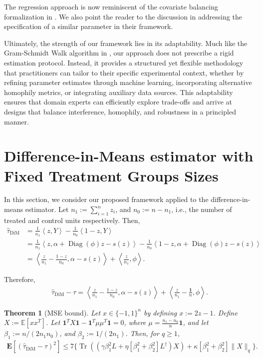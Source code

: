 \documentclass[12pt]{article}
\newtheorem{theorem}{Theorem}
\theoremstyle{definition}
\numberwithin{equation}{section}
\numberwithin{figure}{section}
\newcommand\dotp[1]{\left\langle #1 \right\rangle}
\newcommand{\Diag}{\operatorname{Diag}}
\numberwithin{equation}{section}
\numberwithin{figure}{section}
\begin{document}
The regression approach is now reminiscent of the covariate balancing formalization in \citep{harshaw2024balancing}. We also point the reader to the discussion in \citep{basse2018model} addressing the specification of a similar parameter in their framework. 

Ultimately, the strength of our framework lies in its adaptability. Much like the Gram-Schmidt Walk algorithm in \cite{harshaw2024balancing}, our approach does not prescribe a rigid estimation protocol. Instead, it provides a structured yet flexible methodology that practitioners can tailor to their specific experimental context, whether by refining parameter estimates through machine learning, incorporating alternative homophily metrics, or integrating auxiliary data sources. This adaptability ensures that domain experts can efficiently explore trade-offs and arrive at designs that balance interference, homophily, and robustness in a principled manner.

\section{Difference-in-Means estimator with Fixed Treatment Groups Sizes} \label{section_dim}

In this section, we consider our proposed framework applied to the difference-in-means estimator. Let $n_1 := \sum_{i=1}^n z_i$, and $n_0 := n-n_1$, i.e., the number of treated and control units respectively. Then,
\begin{align*}
    \hat{\tau}_{\text{DiM}} &= \frac{1}{n_1} \dotp{z, Y} - \frac{1}{n_0} \dotp{1 - z, Y} \\
    &=\frac{1}{n_1} \dotp{z,  \alpha + \Diag(\phi)z - s(z)} - \frac{1}{n_0} \dotp{1 - z,  \alpha + \Diag(\phi)z -  s(z)} \\
    &= \left\langle\frac{z}{n_1} - \frac{1 - z}{n_0}, \alpha - s(z) \right\rangle + \left\langle\frac{z}{n_1}, \phi \right \rangle. 
\end{align*}

Therefore, 
\begin{align*}
    \hat{\tau}_{\text{DiM}} - \tau = \left\langle\frac{z}{n_1} - \frac{1 - z}{n_0}, \alpha - s(z) \right\rangle + \left\langle\frac{z}{n_1} - \frac{\mathbf{1}}{n}, \phi \right \rangle. 
\end{align*}

\begin{theorem}[MSE bound] \label{thm:mse_bound_general_DiM}
Let $x \in \{-1, 1\}^n$ by defining $x := 2z-1$. Define $X := \mathbb{E}[xx^T]$. Let $\mathbf{1}^T X \mathbf{1} - \mathbf{1}^T \mu \mu^T \mathbf{1} = 0$, where $\mu = \frac{n_1 - n_0}{n} \mathbf{1}$, and let $\beta_1:=   n/(2n_1 n_0)$, and  $\beta_2:= 1/(2 n_1)$. Then, for $q \geq 1$,
\begin{align*}
\mathbf{E}[(\hat{\tau}_{\text{DiM}} - \tau)^2] \leq 7 \{ \operatorname{Tr}((\gamma \beta_1^2 L + \eta[\beta_1^2 + \beta_2^2]L^\dagger) X) + \kappa[\beta_1^2 + \beta_2^2]\|X\|_{q} \}.
\end{align*}
\end{theorem}
\end{document}
